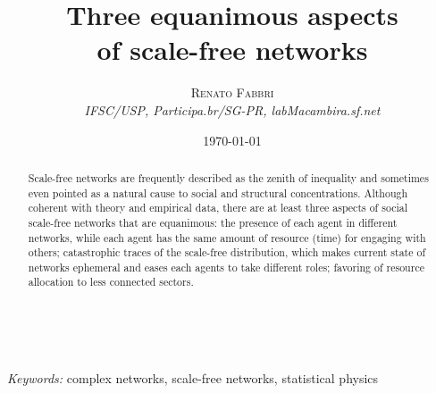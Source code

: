 \documentclass[a4paper, 11pt]{article} %
\title{\textbf{Three equanimous aspects\\of scale-free networks}\\ %
} %
\author{\textsc{Renato Fabbri} %
\\{\textit{IFSC/USP, Participa.br/SG-PR, labMacambira.sf.net}}} %
\date{\today} %
\makeatletter
\renewcommand{\maketitle}{ %
\begin{flushright} %
{\LARGE\@title} %

\vspace{50pt} %

{\large\@author} %
\\\@date %

\vspace{40pt} %
\end{flushright}
}
\makeatother
\begin{document}
\maketitle %




\begin{abstract}
Scale-free networks are frequently described as the zenith of inequality and sometimes even pointed as a natural cause to social and structural concentrations. Although coherent with theory and empirical data, there are at least three aspects of social scale-free networks that are equanimous: the presence of each agent in different networks, while each agent has the same amount of resource (time) for engaging with others; catastrophic traces of the scale-free distribution, which makes current state of networks ephemeral and eases each agents to take different roles; favoring of resource allocation to less connected sectors.
\end{abstract}

%

\hspace*{3,6mm}\textit{Keywords:} complex networks, scale-free networks, statistical physics %


\newpage
\tableofcontents
\end{document}
